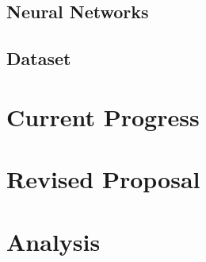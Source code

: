 \documentclass[11pt,twocolumn]{article}
\begin{document}
		\subsection{Neural Networks}
		\subsection{Dataset}

	\section{Current Progress}

	\section{Revised Proposal}
		
	\section{Analysis}

	
		
	
	\begin{thebibliography}{9}
		
	\end{thebibliography}
\end{document}
